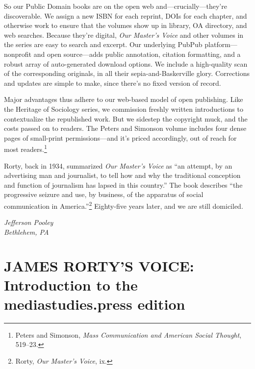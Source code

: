 \documentclass[nohyper,openany,nobib]{tufte-book}
\let\oldchapter\chapter
\def\chapter{%
  \setcounter{footnote}{0}%
  \oldchapter
}
\begin{document}
So our Public Domain books are on the open web and---crucially---they're
discoverable. We assign a new ISBN for each reprint, DOIs for each
chapter, and otherwise work to ensure that the volumes show up in
library, OA directory, and web searches. Because they're digital,
\emph{Our Master's Voice} and other volumes in the series are easy to
search and excerpt. Our underlying PubPub platform---nonprofit and open
source---adds public annotation, citation formatting, and a robust array
of auto-generated download options. We include a high-quality scan of
the corresponding originals, in all their sepia-and-Baskerville glory.
Corrections and updates are simple to make, since there's no fixed
version of record.

Major advantages thus adhere to our web-based model of open publishing.
Like the Heritage of Sociology series, we commission freshly written
introductions to contextualize the republished work. But we sidestep the
copyright muck, and the costs passed on to readers. The Peters and
Simonson volume includes four dense pages of small-print
permissions---and it's priced accordingly, out of reach for most
readers.\footnote{Peters and Simonson, \emph{Mass Communication and American Social
  Thought}, 519--23.}

Rorty, back in 1934, summarized \emph{Our Master's Voice} as ``an
attempt, by an advertising man and journalist, to tell how and why the
traditional conception and function of journalism has lapsed in this
country.'' The book describes ``the progressive seizure and use, by
business, of the apparatus of social communication in America.''\footnote{Rorty, \emph{Our Master's Voice}, ix.}
Eighty-five years later, and we are still domiciled.

\begin{flushright}\emph{Jefferson Pooley}\\ \emph{Bethlehem, PA}\end{flushright}


\newpage
\thispagestyle{plain} %
\mbox{}

\chapter[JAMES RORTY'S VOICE: Introduction to the mediastudies.press edition]{JAMES RORTY'S VOICE: Introduction to the\\ mediastudies.press edition}
\label{ch:introduction-msp}

\emph{}
\end{document}
